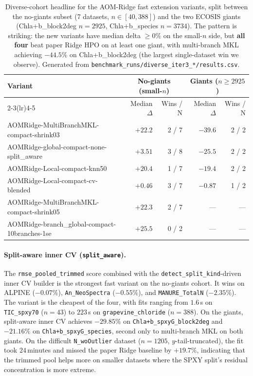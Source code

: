 \documentclass[11pt,a4paper]{article}
\begin{document}
\begin{table}[t]
\centering
\caption{Diverse-cohort headline for the AOM-Ridge fast extension
variants, split between the no-giants subset (7 datasets,
$n\!\in\![40,388]$) and the two ECOSIS giants (Chla+b\_block2deg
$n=2925$, Chla+b\_species $n=3734$). The pattern is striking:
the new variants have median delta $\geq 0\%$ on the small-$n$
side, but \textbf{all four} beat paper Ridge HPO on at least one
giant, with multi-branch MKL achieving $-44.5\%$ on
Chla+b\_block2deg (the largest single-dataset win we observe).
Generated from \texttt{benchmark\_runs/diverse\_iter3\_*/results.csv}.}
\label{tab:h-extensions-diverse}
\begin{tabular}{lrrrr}
\toprule
\multicolumn{1}{l}{Variant} & \multicolumn{2}{c}{No-giants (small-$n$)} & \multicolumn{2}{c}{Giants ($n\!\geq\!2925$)} \\
\cmidrule(lr){2-3}\cmidrule(lr){4-5}
& Median $\Delta$ & Wins / N & Median $\Delta$ & Wins / N \\
\midrule
AOMRidge-MultiBranchMKL-compact-shrink03      & $+22.2$ & 2 / 7 & $\bm{-39.6}$ & 2 / 2 \\
AOMRidge-global-compact-none-split\_aware     & $+3.51$ & 3 / 8 & $\bm{-25.5}$ & 2 / 2 \\
AOMRidge-Local-compact-knn50                  & $+20.4$ & 1 / 7 & $\bm{-19.4}$ & 2 / 2 \\
AOMRidge-Local-compact-cv-blended             & $+0.46$ & 3 / 7 & $-0.87$ & 1 / 2 \\
AOMRidge-MultiBranchMKL-compact-shrink05      & $+22.3$ & 2 / 7 & --- & --- \\
AOMRidge-branch\_global-compact-10branches-1se & $+25.5$ & 0 / 2 & --- & --- \\
\bottomrule
\end{tabular}
\end{table}

\paragraph{Split-aware inner CV (\texttt{split\_aware}).}
The \texttt{rmse\_pooled\_trimmed} score combined with the
\texttt{detect\_split\_kind}-driven inner CV builder is the strongest
fast variant on the no-giants cohort. It wins on ALPINE
($-0.07\%$), \texttt{An\_NeoSpectra} ($-0.55\%$), and
\texttt{MANURE\_TotalN} ($-2.35\%$). The variant is the cheapest of
the four, with fits ranging from $1.6$\,s on \texttt{TIC\_spxy70}
($n=43$) to $223$\,s on \texttt{grapevine\_chloride} ($n=388$).
On the giants, split-aware inner CV achieves $\bm{-29.85\%}$ on
\texttt{Chla+b\_spxyG\_block2deg} and $\bm{-21.16\%}$ on
\texttt{Chla+b\_spxyG\_species}, second only to multi-branch MKL on
both giants. On the difficult \texttt{N\_woOutlier} dataset
($n=1205$, $y$-tail-truncated), the fit took $24$\,minutes and
missed the paper Ridge baseline by $+19.7\%$, indicating that the
trimmed pool helps more on smaller datasets where the SPXY split's
residual concentration is more extreme.
\end{document}
